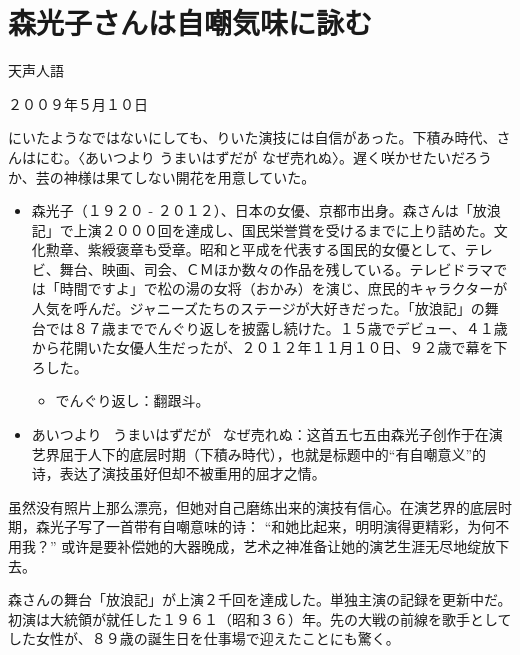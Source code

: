 \documentclass{ctexart}
\newcommand{\bbigbreak}{\bigbreak \bigbreak}
\begin{document}
\section*{\gothic 森光子さんは自嘲気味に詠む}

\begin{center}
    \mincho
    天声人語

    ２００９年５月１０日
\end{center}


\mincho
{}にいたようなではないにしても、りいた演技には自信があった。下積み時代、さんはにむ。〈あいつより うまいはずだが なぜ売れぬ〉。遅く咲かせたいだろうか、芸の神様は果てしない開花を用意していた。

\begin{itemize}
    \mincho
    \item 森光子（１９２０ - ２０１２）、日本の女優、京都市出身。森さんは「放浪記」で上演２０００回を達成し、国民栄誉賞を受けるまでに上り詰めた。文化勲章、紫綬褒章も受章。昭和と平成を代表する国民的女優として、テレビ、舞台、映画、司会、ＣＭほか数々の作品を残している。テレビドラマでは「時間ですよ」で松の湯の女将（おかみ）を演じ、庶民的キャラクターが人気を呼んだ。ジャニーズたちのステージが大好きだった。「放浪記」の舞台では８７歳まででんぐり返しを披露し続けた。１５歳でデビュー、４１歳から花開いた女優人生だったが、２０１２年１１月１０日、９２歳で幕を下ろした。
    \rmfamily
    \begin{itemize}
        \item \mincho でんぐり返し：\rmfamily 翻跟斗。
    \end{itemize}
    \item \mincho あいつより \ うまいはずだが \ なぜ売れぬ：\rmfamily 这首五七五由森光子创作于在演艺界屈于人下的底层时期（下積み時代），也就是标题中的“有自嘲意义”的诗，表达了演技虽好但却不被重用的屈才之情。
\end{itemize}

\rmfamily
虽然没有照片上那么漂亮，但她对自己磨练出来的演技有信心。在演艺界的底层时期，森光子写了一首带有自嘲意味的诗： “和她比起来，明明演得更精彩，为何不用我？” 或许是要补偿她的大器晚成，艺术之神准备让她的演艺生涯无尽地绽放下去。

\bbigbreak

\mincho
森さんの舞台「放浪記」が上演２千回を達成した。単独主演の記録を更新中だ。初演は大統領が就任した１９６１（昭和３６）年。先の大戦の前線を歌手としてした女性が、８９歳の誕生日を仕事場で迎えたことにも驚く。
\end{document}
